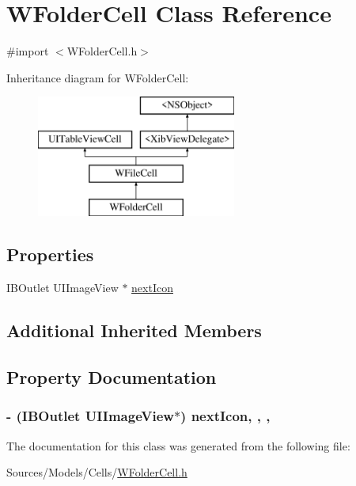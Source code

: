 \hypertarget{interface_w_folder_cell}{\section{W\-Folder\-Cell Class Reference}
\label{interface_w_folder_cell}
}


{\ttfamily \#import $<$W\-Folder\-Cell.\-h$>$}

Inheritance diagram for W\-Folder\-Cell\-:\begin{figure}[H]
\begin{center}
\leavevmode
\includegraphics[height=4.000000cm]{interface_w_folder_cell}
\end{center}
\end{figure}
\subsection*{Properties}
\begin{DoxyCompactItemize}
\item 
I\-B\-Outlet U\-I\-Image\-View $\ast$ \hyperlink{interface_w_folder_cell_a09c13a7ddf4d986763d35fd1b1105fc8}{next\-Icon}
\end{DoxyCompactItemize}
\subsection*{Additional Inherited Members}


\subsection{Property Documentation}
\hypertarget{interface_w_folder_cell_a09c13a7ddf4d986763d35fd1b1105fc8}{
\subsubsection[{next\-Icon}]{\setlength{\rightskip}{0pt plus 5cm}-\/ (I\-B\-Outlet U\-I\-Image\-View$\ast$) next\-Icon\hspace{0.3cm}{\ttfamily [read]}, {\ttfamily [write]}, {\ttfamily [nonatomic]}, {\ttfamily [retain]}}}\label{interface_w_folder_cell_a09c13a7ddf4d986763d35fd1b1105fc8}


The documentation for this class was generated from the following file\-:\begin{DoxyCompactItemize}
\item 
Sources/\-Models/\-Cells/\hyperlink{_w_folder_cell_8h}{W\-Folder\-Cell.\-h}\end{DoxyCompactItemize}
